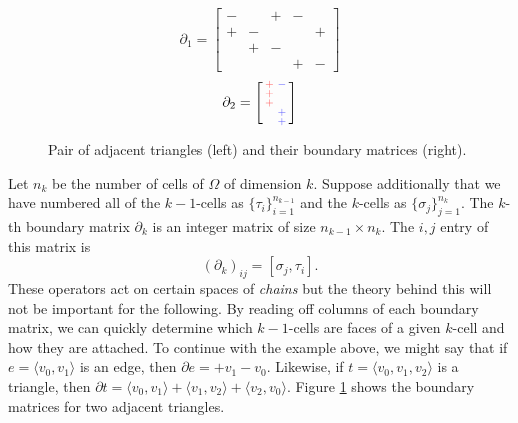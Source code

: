 \documentclass[twocolumn]{article}
\begin{document}
\begin{figure}[t]
    \begin{minipage}{0.48\linewidth}
        \begin{center}
            
        \end{center}
    \end{minipage}
    \hfill
    \begin{minipage}{0.48\linewidth}
        {\small
            \begin{equation*}
                \partial_1 = \left[\begin{smallmatrix}
                    - &   & + & - &   \\
                    + & - &   &   & + \\
                      & + & - &   &   \\
                      &   &   & + & -
                \end{smallmatrix}\right]
            \end{equation*}
            \begin{equation*}
                \partial_2 = \left[\begin{smallmatrix}
                    \textcolor{red!65}+ & \textcolor{blue!65}- \\
                    \textcolor{red!65}+ &   \\
                    \textcolor{red!65}+ &   \\
                      & \textcolor{blue!65}+ \\
                      & \textcolor{blue!65}+
                \end{smallmatrix}\right]
            \end{equation*}
        }
    \end{minipage}
    \caption{Pair of adjacent triangles (left) and their boundary matrices (right).}
    \label{fig:two-triangle-chain-complex}
\end{figure}

Let $n_k$ be the number of cells of $\Omega$ of dimension $k$.
Suppose additionally that we have numbered all of the $k - 1$-cells as $\{\tau_i\}_{i = 1}^{n_{k - 1}}$ and the $k$-cells as $\{\sigma_j\}_{j = 1}^{n_k}$.
The $k$-th boundary matrix $\partial_k$ is an integer matrix of size $n_{k - 1} \times n_k$.
The $i, j$ entry of this matrix is
\begin{equation}
    (\partial_k)_{ij} = [\sigma_j, \tau_i].
\end{equation}
These operators act on certain spaces of \emph{chains} but the theory behind this will not be important for the following.
By reading off columns of each boundary matrix, we can quickly determine which $k - 1$-cells are faces of a given $k$-cell and how they are attached.
To continue with the example above, we might say that if $e = \langle v_0, v_1\rangle$ is an edge, then $\partial e = +v_1 - v_0$.
Likewise, if $t = \langle v_0, v_1, v_2\rangle$ is a triangle, then $\partial t = \langle v_0, v_1\rangle + \langle v_1, v_2\rangle + \langle v_2, v_0\rangle$.
Figure \ref{fig:two-triangle-chain-complex} shows the boundary matrices for two adjacent triangles.
\end{document}
